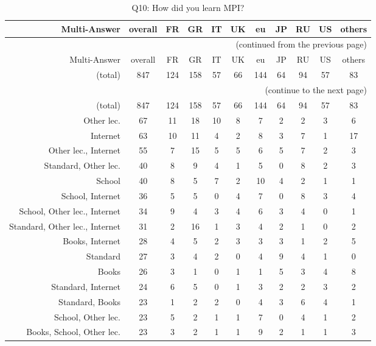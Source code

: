 \clearpage%
{\footnotesize\begin{landscape}%
\begin{longtable}[htb]{r|c|c|c|c|c|c|c|c|c|c}%
\caption{Q10: How did you learn MPI?}%
\label{tab:Q10-mans} \\%
\hline%
Multi-Answer & overall & FR & GR & IT & UK & eu & JP & RU & US & others \\
 \hline%
\endfirsthead%
\multicolumn{11}{r}{(continued from the previous page)}\\%
\hline%
Multi-Answer & overall & FR & GR & IT & UK & eu & JP & RU & US & others \\
 \hline%
\endhead%
\hline%
(total) & 847 & 124 & 158 & 57 & 66 & 144 & 64 & 94 & 57 & 83 \\%
\hline%
\multicolumn{11}{r}{(continue to the next page)}\\%
\endfoot%
\hline%
(total) & 847 & 124 & 158 & 57 & 66 & 144 & 64 & 94 & 57 & 83 \\%
\hline%
\endlastfoot%
\hline%
{Other lec.} & 67 & 11 & 18 & 10 & 8 & 7 & 2 & 2 & 3 & 6 \\%
{Internet} & 63 & 10 & 11 & 4 & 2 & 8 & 3 & 7 & 1 & 17 \\%
{Other lec., Internet} & 55 & 7 & 15 & 5 & 5 & 6 & 5 & 7 & 2 & 3 \\%
{Standard, Other lec.} & 40 & 8 & 9 & 4 & 1 & 5 & 0 & 8 & 2 & 3 \\%
{School} & 40 & 8 & 5 & 7 & 2 & 10 & 4 & 2 & 1 & 1 \\%
{School, Internet} & 36 & 5 & 5 & 0 & 4 & 7 & 0 & 8 & 3 & 4 \\%
{School, Other lec., Internet} & 34 & 9 & 4 & 3 & 4 & 6 & 3 & 4 & 0 & 1 \\%
{Standard, Other lec., Internet} & 31 & 2 & 16 & 1 & 3 & 4 & 2 & 1 & 0 & 2 \\%
{Books, Internet} & 28 & 4 & 5 & 2 & 3 & 3 & 3 & 1 & 2 & 5 \\%
{Standard} & 27 & 3 & 4 & 2 & 0 & 4 & 9 & 4 & 1 & 0 \\%
{Books} & 26 & 3 & 1 & 0 & 1 & 1 & 5 & 3 & 4 & 8 \\%
{Standard, Internet} & 24 & 6 & 5 & 0 & 1 & 3 & 2 & 2 & 3 & 2 \\%
{Standard, Books} & 23 & 1 & 2 & 2 & 0 & 4 & 3 & 6 & 4 & 1 \\%
{School, Other lec.} & 23 & 5 & 2 & 1 & 1 & 7 & 0 & 4 & 1 & 2 \\%
{Books, School, Other lec.} & 23 & 3 & 2 & 1 & 1 & 9 & 2 & 1 & 1 & 3 \\%

\end{longtable}
\end{landscape}}
